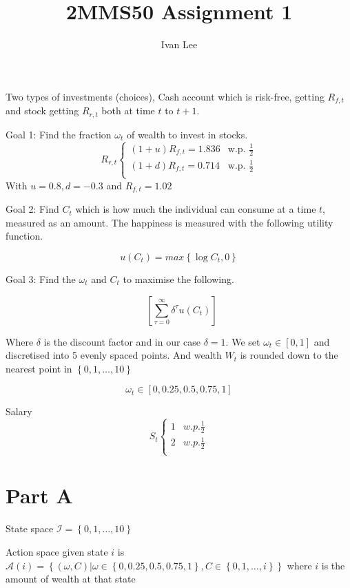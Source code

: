 \documentclass[12pt]{article}
\begin{document}
\title{2MMS50 Assignment 1}
\author{Ivan Lee}
\maketitle

Two types of investments (choices), Cash account which is risk-free, getting
$R_{f,t}$ and stock getting $R_{r,t}$ both at time $t$ to $t+1$.

Goal 1: Find the fraction $\omega_t$ of wealth to invest in stocks. $$R_{r,t} \begin{cases}
		(1+u)R_{f,t}=1.836 & \text{w.p. } \frac{1}{2} \\
		(1+d)R_{f,t}=0.714 & \text{w.p. } \frac{1}{2} \\
	\end{cases}
$$
With $u = 0.8, d = -0.3$ and $R_{f,t}=1.02$

Goal 2: Find $C_t$ which is how much the individual can consume at a time $t$,
measured as an amount. The happiness is measured with the following utility
function.

$$
	u(C_t) = max\left\{ \log C_t, 0\right\}
$$

Goal 3: Find the $\omega_t$ and $C_t$ to maximise the following.

$$\mathop{\mathbb{E}_0}\left[\sum_{\tau=0}^{\infty}\delta^\tau u\left(C_t\right)\right]$$

Where $\delta$ is the discount factor and in our case $\delta=1$. We set
$\omega_t \in \left[0,1\right]$ and discretised into 5 evenly spaced points.
And wealth $W_t$ is rounded down to the nearest point in $\left\{0,1,\dots,
	10\right\}$

$$\omega_t \in \left[0,0.25,0.5,0.75,1\right]$$

Salary $$S_{t} \begin{cases}
		1 & w.p. \frac{1}{2} \\
		2 & w.p. \frac{1}{2} \\
	\end{cases}$$

\section{Part A}
State space $\mathcal{I} = \left\{0,1,\dots,10\right\}$

Action space given state $i$ is $\mathcal{A}(i) = \left\{(\omega, C) | \omega
	\in \left\{0,0.25,0.5,0.75,1\right\}, C \in \left\{0,1,\dots,i\right\}\right\}$
where $i$ is the amount of wealth at that state
\end{document}

